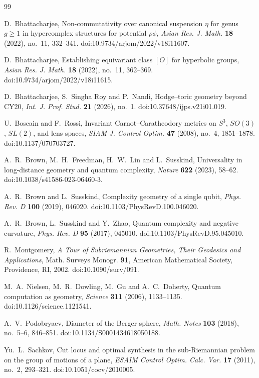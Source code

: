 \documentclass[11pt]{amsart}
\theoremstyle{definition}
\begin{document}
\begin{thebibliography}{99}

 D.~Bhattacharjee, Non-commutativity over canonical suspension $\eta$ for genus $g\ge1$ in hypercomplex structures for potential $\rho\phi$, \emph{Asian Res. J. Math.} \textbf{18} (2022), no.~11, 332--341. doi:10.9734/arjom/2022/v18i11607.

 D.~Bhattacharjee, Establishing equivariant class $[O]$ for hyperbolic groups, \emph{Asian Res. J. Math.} \textbf{18} (2022), no.~11, 362--369. doi:10.9734/arjom/2022/v18i11615.

 D.~Bhattacharjee, S.~Singha Roy and P.~Nandi, Hodge--toric geometry beyond CY20, \emph{Int. J. Prof. Stud.} \textbf{21} (2026), no.~1. doi:10.37648/ijps.v21i01.019.

 U.~Boscain and F.~Rossi, Invariant Carnot--Caratheodory metrics on $S^3$, $SO(3)$, $SL(2)$, and lens spaces, \emph{SIAM J. Control Optim.} \textbf{47} (2008), no.~4, 1851--1878. doi:10.1137/070703727.

 A.~R.~Brown, M.~H.~Freedman, H.~W.~Lin and L.~Susskind, Universality in long-distance geometry and quantum complexity, \emph{Nature} \textbf{622} (2023), 58--62. doi:10.1038/s41586-023-06460-3.

 A.~R.~Brown and L.~Susskind, Complexity geometry of a single qubit, \emph{Phys. Rev. D} \textbf{100} (2019), 046020. doi:10.1103/PhysRevD.100.046020.

 A.~R.~Brown, L.~Susskind and Y.~Zhao, Quantum complexity and negative curvature, \emph{Phys. Rev. D} \textbf{95} (2017), 045010. doi:10.1103/PhysRevD.95.045010.

 R.~Montgomery, \emph{A Tour of Subriemannian Geometries, Their Geodesics and Applications}, Math. Surveys Monogr. \textbf{91}, American Mathematical Society, Providence, RI, 2002. doi:10.1090/surv/091.

 M.~A.~Nielsen, M.~R.~Dowling, M.~Gu and A.~C.~Doherty, Quantum computation as geometry, \emph{Science} \textbf{311} (2006), 1133--1135. doi:10.1126/science.1121541.

 A.~V.~Podobryaev, Diameter of the Berger sphere, \emph{Math. Notes} \textbf{103} (2018), no.~5--6, 846--851. doi:10.1134/S0001434618050188.

 Yu.~L.~Sachkov, Cut locus and optimal synthesis in the sub-Riemannian problem on the group of motions of a plane, \emph{ESAIM Control Optim. Calc. Var.} \textbf{17} (2011), no.~2, 293--321. doi:10.1051/cocv/2010005.

\end{thebibliography}
\end{document}
